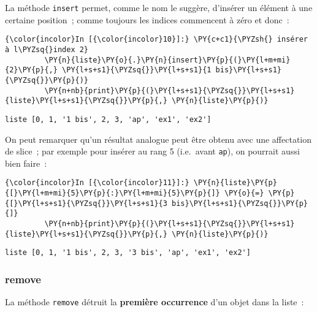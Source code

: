     La méthode \texttt{insert} permet, comme le nom le suggère, d'insérer un
élément à une certaine position~; comme toujours les indices commencent
à zéro et donc~:

    \begin{Verbatim}[commandchars=\\\{\}]
{\color{incolor}In [{\color{incolor}10}]:} \PY{c+c1}{\PYZsh{} insérer à l\PYZsq{}index 2}
         \PY{n}{liste}\PY{o}{.}\PY{n}{insert}\PY{p}{(}\PY{l+m+mi}{2}\PY{p}{,} \PY{l+s+s1}{\PYZsq{}}\PY{l+s+s1}{1 bis}\PY{l+s+s1}{\PYZsq{}}\PY{p}{)}
         \PY{n+nb}{print}\PY{p}{(}\PY{l+s+s1}{\PYZsq{}}\PY{l+s+s1}{liste}\PY{l+s+s1}{\PYZsq{}}\PY{p}{,} \PY{n}{liste}\PY{p}{)}
\end{Verbatim}


    \begin{Verbatim}[commandchars=\\\{\}]
liste [0, 1, '1 bis', 2, 3, 'ap', 'ex1', 'ex2']

    \end{Verbatim}

    On peut remarquer qu'un résultat analogue peut être obtenu avec une
affectation de slice~; par exemple pour insérer au rang 5 (i.e.~avant
\texttt{ap}), on pourrait aussi bien faire~:

    \begin{Verbatim}[commandchars=\\\{\}]
{\color{incolor}In [{\color{incolor}11}]:} \PY{n}{liste}\PY{p}{[}\PY{l+m+mi}{5}\PY{p}{:}\PY{l+m+mi}{5}\PY{p}{]} \PY{o}{=} \PY{p}{[}\PY{l+s+s1}{\PYZsq{}}\PY{l+s+s1}{3 bis}\PY{l+s+s1}{\PYZsq{}}\PY{p}{]}
         \PY{n+nb}{print}\PY{p}{(}\PY{l+s+s1}{\PYZsq{}}\PY{l+s+s1}{liste}\PY{l+s+s1}{\PYZsq{}}\PY{p}{,} \PY{n}{liste}\PY{p}{)}
\end{Verbatim}


    \begin{Verbatim}[commandchars=\\\{\}]
liste [0, 1, '1 bis', 2, 3, '3 bis', 'ap', 'ex1', 'ex2']

    \end{Verbatim}

    \hypertarget{remove}{%
\subsubsection{\texorpdfstring{\textbf{remove}}{remove}}\label{remove}}

    La méthode \texttt{remove} détruit la \textbf{première occurrence} d'un
objet dans la liste~:

